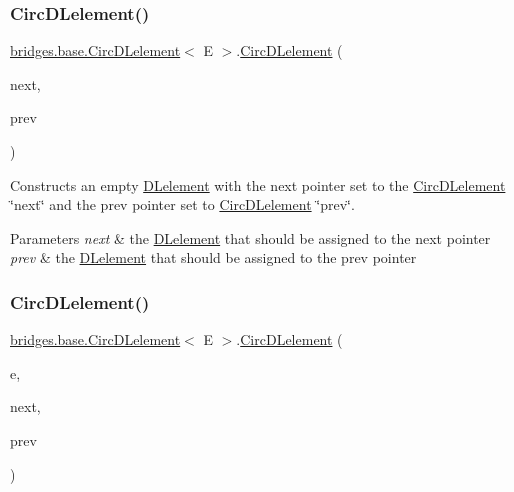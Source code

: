 \subsubsection{\texorpdfstring{Circ\+D\+Lelement()}{CircDLelement()}\hspace{0.1cm}{\footnotesize\ttfamily [3/4]}}
{\footnotesize\ttfamily \hyperlink{classbridges_1_1base_1_1_circ_d_lelement}{bridges.\+base.\+Circ\+D\+Lelement}$<$ E $>$.\hyperlink{classbridges_1_1base_1_1_circ_d_lelement}{Circ\+D\+Lelement} (\begin{DoxyParamCaption}\item[{\hyperlink{classbridges_1_1base_1_1_circ_d_lelement}{Circ\+D\+Lelement}$<$ E $>$}]{next,  }\item[{\hyperlink{classbridges_1_1base_1_1_circ_d_lelement}{Circ\+D\+Lelement}$<$ E $>$}]{prev }\end{DoxyParamCaption})}

Constructs an empty \hyperlink{classbridges_1_1base_1_1_d_lelement}{D\+Lelement} with the next pointer set to the \hyperlink{classbridges_1_1base_1_1_circ_d_lelement}{Circ\+D\+Lelement} \char`\"{}next\char`\"{} and the prev pointer set to \hyperlink{classbridges_1_1base_1_1_circ_d_lelement}{Circ\+D\+Lelement} \char`\"{}prev\char`\"{}.


\begin{DoxyParams}{Parameters}
{\em next} & the \hyperlink{classbridges_1_1base_1_1_d_lelement}{D\+Lelement} that should be assigned to the next pointer \\
\hline
{\em prev} & the \hyperlink{classbridges_1_1base_1_1_d_lelement}{D\+Lelement} that should be assigned to the prev pointer \\
\hline
\end{DoxyParams}
\hypertarget{classbridges_1_1base_1_1_circ_d_lelement_a86e04c826251be9a1a92c4649844e5e7}{}\label{classbridges_1_1base_1_1_circ_d_lelement_a86e04c826251be9a1a92c4649844e5e7} 
\subsubsection{\texorpdfstring{Circ\+D\+Lelement()}{CircDLelement()}\hspace{0.1cm}{\footnotesize\ttfamily [4/4]}}
{\footnotesize\ttfamily \hyperlink{classbridges_1_1base_1_1_circ_d_lelement}{bridges.\+base.\+Circ\+D\+Lelement}$<$ E $>$.\hyperlink{classbridges_1_1base_1_1_circ_d_lelement}{Circ\+D\+Lelement} (\begin{DoxyParamCaption}\item[{E}]{e,  }\item[{\hyperlink{classbridges_1_1base_1_1_circ_d_lelement}{Circ\+D\+Lelement}$<$ E $>$}]{next,  }\item[{\hyperlink{classbridges_1_1base_1_1_circ_d_lelement}{Circ\+D\+Lelement}$<$ E $>$}]{prev }\end{DoxyParamCaption})}

